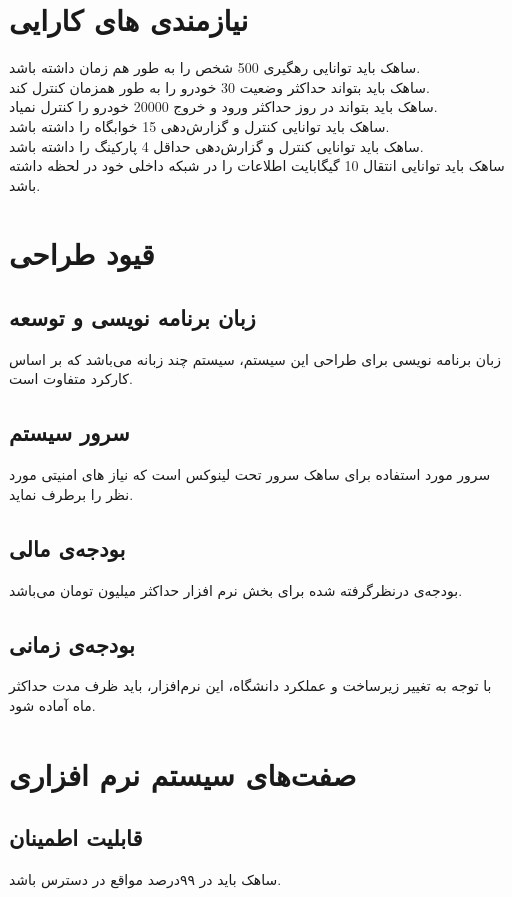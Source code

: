 \documentclass[oneside,a4paper,12pt]{book}
\begin{document}
	\section{نیازمندی های کارایی}
	\noindent
	ساهک باید توانایی رهگیری 500 شخص را به طور هم زمان داشته باشد.\\
	\noindent
	ساهک باید بتواند حداکثر وضعیت 30 خودرو را به طور همزمان کنترل کند.	\\
	\noindent
	ساهک باید بتواند در روز حداکثر ورود و خروج 20000 خودرو را کنترل نمیاد.\\
	\noindent
	ساهک باید توانایی کنترل و گزارش‌دهی 15 خوابگاه را داشته باشد. \\
	\noindent
	ساهک باید توانایی کنترل و گزارش‌دهی حداقل 4 پارکینگ را داشته باشد.\\
	\noindent
	ساهک باید توانایی انتقال 10 گیگابایت اطلاعات را در شبکه داخلی خود در لحظه داشته باشد.
	
	\section{قیود طراحی}
	\subsection{زبان برنامه نویسی و توسعه}
	زبان برنامه نویسی برای طراحی این سیستم، سیستم چند زبانه می‌باشد که بر اساس کارکرد متفاوت است.
	\subsection{سرور سیستم}
	سرور مورد استفاده برای ساهک سرور تحت لینوکس است که نیاز های امنیتی مورد نظر را برطرف نماید.
	\subsection{بودجه‌ی مالی}
	بودجه‌ی درنظرگرفته شده برای بخش نرم افزار حداکثر میلیون تومان می‌باشد.
	\subsection{بودجه‌ی زمانی}
	با توجه به تغییر زیرساخت و عملکرد دانشگاه‌، این نرم‌افزار، باید ظرف مدت حداکثر ماه آماده شود.
	
	\section{صفت‌های سیستم نرم افزاری}
	\subsection{قابلیت اطمینان}
	ساهک باید در ۹۹درصد مواقع در دسترس باشد.
\end{document}
